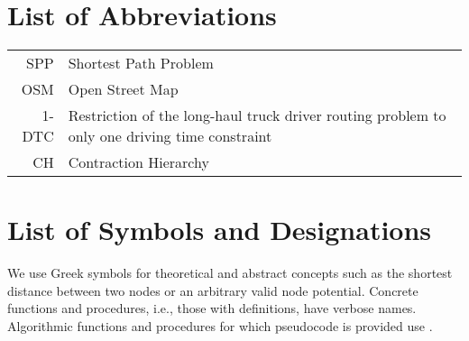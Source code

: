 

\appendix

{}	%
{}	%

\section{List of Abbreviations}
\label{app:abb}

\begin{tabular}{rp{}}
	SPP   & Shortest Path Problem                                                                         \\
	OSM   & Open Street Map                                                                               \\
	1-DTC & Restriction of the long-haul truck driver routing problem to only one driving time constraint \\
	CH    & Contraction Hierarchy                                                                         \\
\end{tabular}



\section{List of Symbols and Designations}
\label{app:symbols}

We use Greek symbols for theoretical and abstract concepts such as the shortest distance between two nodes or an arbitrary valid node potential. Concrete functions and procedures, i.e., those with definitions, have verbose names. Algorithmic functions and procedures for which pseudocode is provided use .

